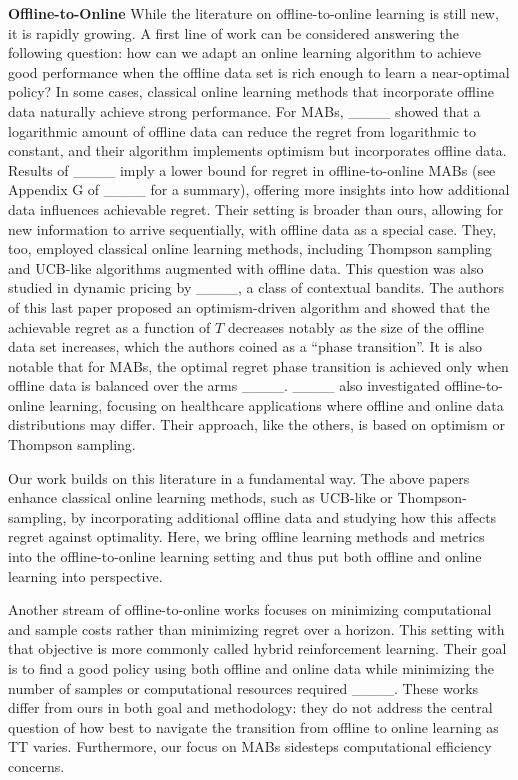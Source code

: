 \textbf{Offline-to-Online} 
While the literature on offline-to-online learning is still new, it is rapidly growing. A first line of work can be considered answering the following question: how can we adapt an online learning algorithm to achieve good performance when the offline data set is rich enough to learn a near-optimal policy? In some cases, classical online learning methods that incorporate offline data naturally achieve strong performance. For MABs, ____ showed that a logarithmic amount of offline data can reduce the regret from logarithmic to constant, and their algorithm implements optimism but incorporates offline data. Results of ____ imply a lower bound for regret in offline-to-online MABs (see Appendix G of ____ for a summary), offering more insights into how additional data influences achievable regret. Their setting is broader than ours, allowing for new information to arrive sequentially, with offline data as a special case. They, too, employed classical online learning methods, including Thompson sampling and UCB-like algorithms augmented with offline data.
This question was also studied in dynamic pricing by ____,  a class of contextual bandits. The authors of this last paper proposed an optimism-driven algorithm and showed that the achievable regret as a function of $T$ decreases notably as the size of the offline data set increases, which the authors coined as a ``phase transition''. It is also notable that for MABs, the optimal regret phase transition is achieved only when offline data is balanced over the arms ____. ____ also investigated offline-to-online learning, focusing on healthcare applications where offline and online data distributions may differ. Their approach, like the others, is based on optimism or Thompson sampling.

Our work builds on this literature in a fundamental way. The above papers enhance classical online learning methods, such as UCB-like or Thompson-sampling, by incorporating additional offline data and studying how this affects regret against optimality. Here, we bring offline learning methods and metrics into the offline-to-online learning setting and thus put both offline and online learning into perspective. 

Another stream of offline-to-online works focuses on minimizing computational and sample costs rather than minimizing regret over a horizon. This setting with that objective is more commonly called hybrid reinforcement learning. Their goal is to find a good policy using both offline and online data while minimizing the number of samples or computational resources required ____. These works differ from ours in both goal and methodology: they do not address the central question of how best to navigate the transition from offline to online learning as TT varies. Furthermore, our focus on MABs sidesteps computational efficiency concerns.

